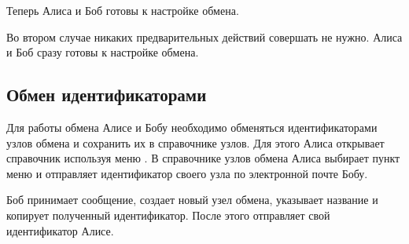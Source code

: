 \documentclass[a4paper,10pt,russian]{sphinxmanual}
\begin{document}
\noindent{}

\noindent{}

\noindent{}

Теперь Алиса и Боб готовы к настройке обмена.

Во втором случае никаких предварительных действий совершать не нужно. Алиса и Боб сразу готовы к настройке обмена.


\subsection{Обмен идентификаторами}
\label{\detokenize{teamwork:id5}}
Для работы обмена Алисе и Бобу необходимо обменяться идентификаторами узлов обмена и сохранить их в справочнике узлов.
Для этого Алиса открывает справочник  используя меню . В справочнике
узлов обмена Алиса выбирает пункт меню  и отправляет идентификатор своего узла
по электронной почте Бобу.

\noindent{}

\noindent{}

\noindent{}

\noindent{}

\noindent{}

\noindent{}

Боб принимает сообщение, создает новый узел обмена, указывает название и копирует полученный идентификатор. После этого отправляет свой идентификатор Алисе.

\noindent{}

\noindent{}
\end{document}
